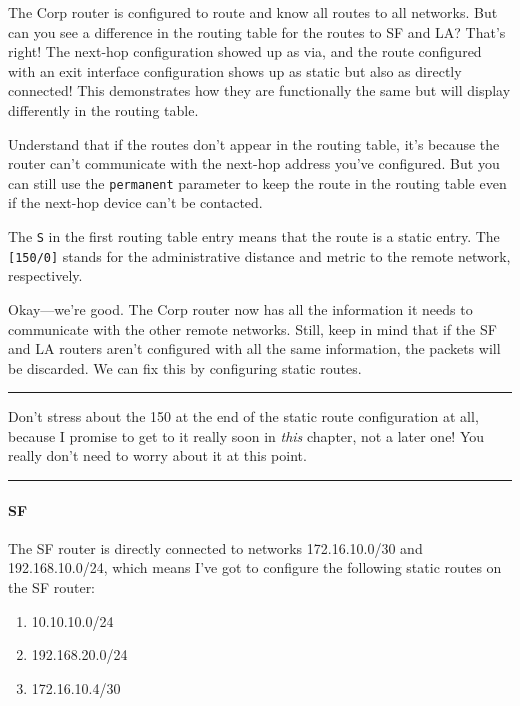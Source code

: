 The Corp router is configured to route and know all routes to all
networks. But can you see a difference in the routing table for the
routes to SF and LA? That's right! The next-hop configuration showed up
as via, and the route configured with an exit interface configuration
shows up as static but also as directly connected! This demonstrates how
they are functionally the same but will display differently in the
routing table.

Understand that if the routes don't appear in the routing table, it's
because the router can't communicate with the next-hop address you've
configured. But you can still use the \texttt{permanent} parameter to
keep the route in the routing table even if the next-hop device can't be
contacted.

The \texttt{S} in the first routing table entry means that the route is
a static entry. The \texttt{{[}150/0{]}} stands for the administrative
distance and metric to the remote network, respectively.

Okay---we're good. The Corp router now has all the information it needs
to communicate with the other remote networks. Still, keep in mind that
if the SF and LA routers aren't configured with all the same
information, the packets will be discarded. We can fix this by
configuring static routes.

\begin{center}\rule{0.5\linewidth}{0.5pt}\end{center}

Don't stress about the 150 at the end
of the static route configuration at all, because I promise to get to it
really soon in \emph{this} chapter, not a later one! You really don't
need to worry about it at this point.

\begin{center}\rule{0.5\linewidth}{0.5pt}\end{center}

\paragraph[SF]{\texorpdfstring{\protect\hypertarget{c09.xhtmlux5cux23Page_386}{}{}SF}{SF}}

The SF router is directly connected to networks 172.16.10.0/30 and
192.168.10.0/24, which means I've got to configure the following static
routes on the SF router:

\begin{enumerate}
\tightlist
\item
  10.10.10.0/24
\item
  192.168.20.0/24
\item
  172.16.10.4/30
\end{enumerate}

